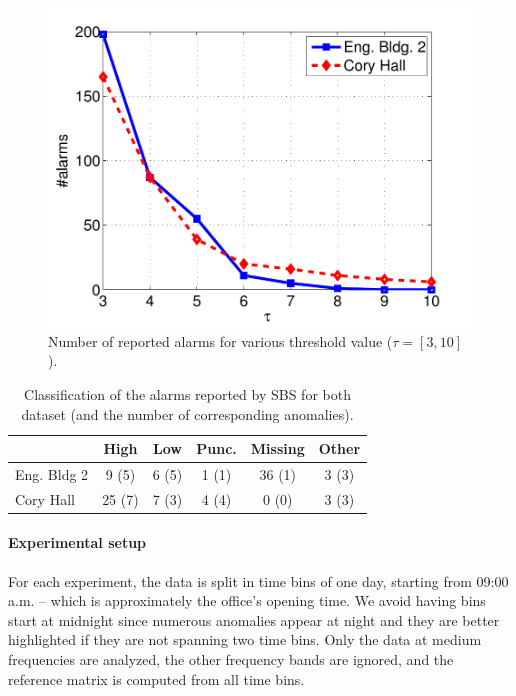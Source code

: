 
\begin{figure}
\begin{center}
 \includegraphics[width=.49\textwidth]{img/threshold-eps-converted-to.pdf}
 \caption{Number of reported alarms for various threshold value ($\tau=[3,10]$).}
 \label{fig:thres}
 \end{center}
\end{figure}

\begin{table}
\begin{center}
\begin{tabular}{|l||c|c|c|c|c|}
\hline
&High&Low&Punc.&Missing&Other\\ \hline \hline
Eng. Bldg 2 & 9 (5) & 6 (5) & 1 (1) & 36 (1) & 3 (3) \\ \hline
Cory Hall & 25 (7) & 7 (3) & 4 (4) & 0 (0) & 3 (3) \\ \hline
\end{tabular}
\end{center}
\caption{Classification of the alarms reported by SBS for both dataset (and the number of corresponding anomalies).}
\label{tab:classif}
\end{table}

\paragraph{Experimental setup}
For each experiment, the data is split in time bins of one day, starting from 09:00 a.m. -- which is approximately 
the office's opening time.
We avoid having bins start at midnight since numerous anomalies appear at night and they are better highlighted if they are 
not spanning two time bins.
Only the data at medium frequencies are analyzed, the other frequency bands are ignored, and the reference matrix is computed from all time bins.


